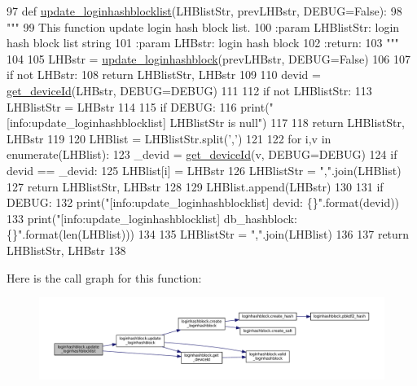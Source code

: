 \begin{DoxyCode}
97 \textcolor{keyword}{def }\hyperlink{namespaceloginhashblock_a2bcc7ddd0fcc3788572dd77808cb624d}{update\_loginhashblocklist}(LHBlistStr, prevLHBstr, DEBUG=False):
98     \textcolor{stringliteral}{"""}
99 \textcolor{stringliteral}{    This function update login hash block list.}
100 \textcolor{stringliteral}{    :param LHBlistStr: login hash block list string}
101 \textcolor{stringliteral}{    :param LHBstr: login hash block}
102 \textcolor{stringliteral}{    :return:}
103 \textcolor{stringliteral}{    """}
104 
105     LHBstr = \hyperlink{namespaceloginhashblock_afef75d97c834ce0fda711b93d0b56b00}{update\_loginhashblock}(prevLHBstr, DEBUG=\textcolor{keyword}{False})
106 
107     \textcolor{keywordflow}{if} \textcolor{keywordflow}{not} LHBstr:
108         \textcolor{keywordflow}{return} LHBlistStr, LHBstr
109 
110     devid = \hyperlink{namespaceloginhashblock_a17417f2f6bca76ab51170082a562e5f6}{get\_deviceId}(LHBstr, DEBUG=DEBUG)
111 
112     \textcolor{keywordflow}{if} \textcolor{keywordflow}{not} LHBlistStr:
113         LHBlistStr = LHBstr
114         
115         \textcolor{keywordflow}{if} DEBUG:
116             print(\textcolor{stringliteral}{"[info:update\_loginhashblocklist] LHBlistStr is null"})
117 
118         \textcolor{keywordflow}{return} LHBlistStr, LHBstr
119 
120     LHBlist = LHBlistStr.split(\textcolor{stringliteral}{','})
121 
122     \textcolor{keywordflow}{for} i,v \textcolor{keywordflow}{in} enumerate(LHBlist):
123         \_devid = \hyperlink{namespaceloginhashblock_a17417f2f6bca76ab51170082a562e5f6}{get\_deviceId}(v, DEBUG=DEBUG)
124         \textcolor{keywordflow}{if} devid == \_devid:
125             LHBlist[i] = LHBstr
126             LHBlistStr = \textcolor{stringliteral}{","}.join(LHBlist)
127             \textcolor{keywordflow}{return} LHBlistStr, LHBstr
128 
129     LHBlist.append(LHBstr)
130 
131     \textcolor{keywordflow}{if} DEBUG:
132         print(\textcolor{stringliteral}{"[info:update\_loginhashblocklist] devid: \{\}"}.format(devid))
133         print(\textcolor{stringliteral}{"[info:update\_loginhashblocklist] db\_hashblock: \{\}"}.format(len(LHBlist)))
134 
135     LHBlistStr = \textcolor{stringliteral}{","}.join(LHBlist)
136 
137     \textcolor{keywordflow}{return} LHBlistStr, LHBstr
138 
\end{DoxyCode}


Here is the call graph for this function\+:\nopagebreak
\begin{figure}[H]
\begin{center}
\leavevmode
\includegraphics[width=350pt]{namespaceloginhashblock_a2bcc7ddd0fcc3788572dd77808cb624d_cgraph}
\end{center}
\end{figure}




